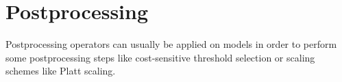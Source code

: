 \section{Postprocessing}

Postprocessing operators can usually be applied on models in order to perform
some postprocessing steps like cost-sensitive threshold selection or scaling
schemes like Platt scaling.
